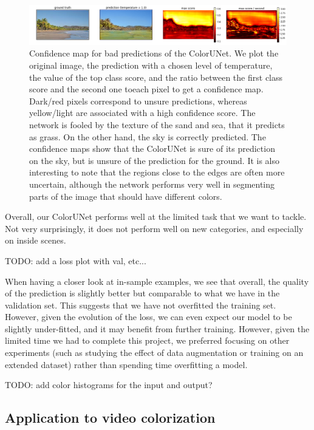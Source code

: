 \documentclass[10pt,twocolumn,letterpaper]{article}
\begin{document}
\begin{figure}
\begin{center}
\includegraphics[width=450px]{confidence}
\caption{Confidence map for bad predictions of the ColorUNet. We plot the original image, the prediction with a chosen level of temperature, the value of the top class score, and the ratio between the first class score and the second one toeach pixel to get a confidence map. Dark/red pixels correspond to unsure predictions, whereas yellow/light are associated with a high confidence score. The network is fooled by the texture of the sand and sea, that it predicts as grass. On the other hand, the sky is correctly predicted. The confidence maps show that the ColorUNet is sure of its prediction on the sky, but is unsure of the prediction for the ground. It is also interesting to note that the regions close to the edges are often more uncertain, although the network performs very well in segmenting parts of the image that should have different colors.}
\label{confidence}
\end{center}
\end{figure}

Overall, our ColorUNet performs well at the limited task that we want to tackle. Not very surprisingly, it does not perform well on new categories, and especially on inside scenes.

TODO: add a loss plot with val, etc... 

When having a closer look at in-sample examples, we see that overall, the quality of the prediction is slightly better but comparable to what we have in the validation set. This suggests that we have not overfitted the training set. However, given the evolution of the loss, we can even expect our model to be slightly under-fitted, and it may benefit from further training. However, given the limited time we had to complete this project, we preferred focusing on other experiments (such as studying the effect of data augmentation or training on an extended dataset) rather than spending time overfitting a model. 


TODO: add color histograms for the input and output? 


\subsection{Application to video colorization}
\end{document}
